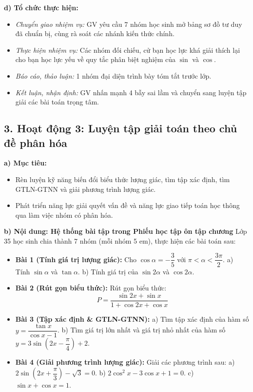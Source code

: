 \documentclass[12pt, a4paper]{article}
\begin{document}
\noindent \textbf{d) Tổ chức thực hiện:}  
\begin{itemize}[leftmargin=0.8cm]  
    \item \textit{Chuyển giao nhiệm vụ:} GV yêu cầu 7 nhóm học sinh mở bảng sơ đồ tư duy đã chuẩn bị, cùng rà soát các nhánh kiến thức chính.  
    \item \textit{Thực hiện nhiệm vụ:} Các nhóm đối chiếu, cử bạn học lực khá giải thích lại cho bạn học lực yếu về quy tắc phân biệt nghiệm của $\sin$ và $\cos$.  
    \item \textit{Báo cáo, thảo luận:} 1 nhóm đại diện trình bày tóm tắt trước lớp.  
    \item \textit{Kết luận, nhận định:} GV nhấn mạnh 4 bẫy sai lầm và chuyển sang luyện tập giải các bài toán trọng tâm.  
\end{itemize}  
  
\subsection*{3. Hoạt động 3: Luyện tập giải toán theo chủ đề phân hóa}  
  
\noindent \textbf{a) Mục tiêu:}  
\begin{itemize}[leftmargin=0.8cm]  
    \item Rèn luyện kỹ năng biến đổi biểu thức lượng giác, tìm tập xác định, tìm GTLN-GTNN và giải phương trình lượng giác.  
    \item Phát triển năng lực giải quyết vấn đề và năng lực giao tiếp toán học thông qua làm việc nhóm có phân hóa.  
\end{itemize}  
  
\noindent \textbf{b) Nội dung: Hệ thống bài tập trong Phiếu học tập ôn tập chương}  
Lớp 35 học sinh chia thành 7 nhóm (mỗi nhóm 5 em), thực hiện các bài toán sau:  
\begin{itemize}[leftmargin=0.6cm]  
    \item \textbf{Bài 1 (Tính giá trị lượng giác):} Cho $\cos\alpha = -\dfrac{3}{5}$ với $\pi < \alpha < \dfrac{3\pi}{2}$.  
    a) Tính $\sin\alpha$ và $\tan\alpha$.  
    b) Tính giá trị của $\sin 2\alpha$ và $\cos 2\alpha$.  
    \item \textbf{Bài 2 (Rút gọn biểu thức):} Rút gọn biểu thức:  
    $$P = \dfrac{\sin 2x + \sin x}{1 + \cos 2x + \cos x}$$  
    \item \textbf{Bài 3 (Tập xác định \& GTLN-GTNN):}  
    a) Tìm tập xác định của hàm số $y = \dfrac{\tan x}{\cos x - 1}$.  
    b) Tìm giá trị lớn nhất và giá trị nhỏ nhất của hàm số $y = 3\sin\left(2x - \dfrac{\pi}{4}\right) + 2$.  
    \item \textbf{Bài 4 (Giải phương trình lượng giác):} Giải các phương trình sau:  
    a) $2\sin\left(2x + \dfrac{\pi}{3}\right) - \sqrt{3} = 0$.  
    b) $2\cos^2 x - 3\cos x + 1 = 0$.  
    c) $\sin x + \cos x = 1$.  
\end{itemize}  
  
\end{document}
